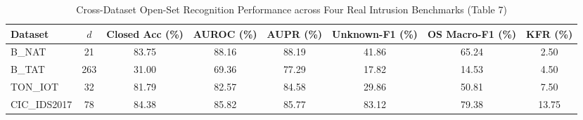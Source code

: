 \begin{table}[t]
\centering
\caption{Cross-Dataset Open-Set Recognition Performance across Four Real Intrusion Benchmarks (Table 7)}
\label{tab:cross_dataset_results_real}
\small
\begin{tabular}{l c c c c c c c}
\toprule
Dataset & $d$ & Closed Acc (\%) & AUROC (\%) & AUPR (\%) & Unknown-F1 (\%) & OS Macro-F1 (\%) & KFR (\%) \\
\midrule
B_NAT & 21 & 83.75 & 88.16 & 88.19 & 41.86 & 65.24 & 2.50 \\
B_TAT & 263 & 31.00 & 69.36 & 77.29 & 17.82 & 14.53 & 4.50 \\
TON_IOT & 32 & 81.79 & 82.57 & 84.58 & 29.86 & 50.81 & 7.50 \\
CIC_IDS2017 & 78 & 84.38 & 85.82 & 85.77 & 83.12 & 79.38 & 13.75 \\
\bottomrule
\end{tabular}
\end{table}